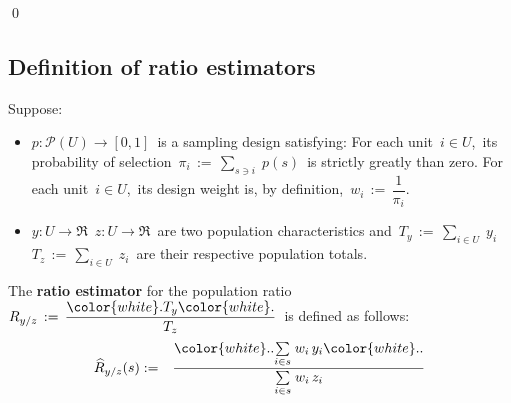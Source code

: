 \qed


\subsection{Definition of ratio estimators}


\begin{definition}
\mbox{}
\vskip 0.05cm
\noindent
Suppose:
\begin{itemize}
\item
    $p : \mathcal{P}(U) \longrightarrow [0,1]$\,
    is a sampling design satisfying:
    For each unit \,$i \in U$,\,
    its probability of selection
    \,$\pi_{i} \,:=\, \underset{s \ni i}{\sum}\;p(s)$\,
    is strictly greatly than zero.
    For each unit \,$i \in U$,\,
    its design weight is, by definition,
    \,$w_{i} \,:=\, \dfrac{1}{\pi_{i}}$.\,
\item
    $y : U \longrightarrow \Re$\,
    $z : U \longrightarrow \Re$\,
    are two population characteristics and
    \,$T_{y} \,:=\, \underset{i \in U}{\sum}\;y_{i}$\,
    \,$T_{z} \,:=\, \underset{i \in U}{\sum}\;z_{i}$\,
    are their respective population totals.
\end{itemize}
The \textbf{ratio estimator} for the population ratio
\,$R_{y/z} \,:=\, \dfrac{{\color{white}.}T_{y}{\color{white}.}}{T_{z}}$\,
is defined as follows:
\begin{eqnarray*}
\widehat{R}_{y/z}(s)
& := &
    \dfrac{{\color{white}..}
        \underset{i \in s}{\sum}\;w_{i}\,y_{i}
        {\color{white}..}}{
        \underset{i \in s}{\sum}\;w_{i}\,z_{i}
        }
\end{eqnarray*}
\end{definition}

